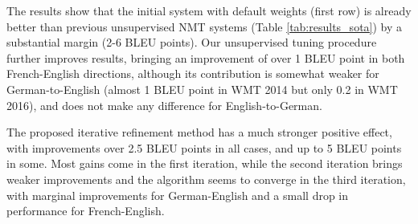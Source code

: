 \documentclass[11pt,a4paper]{article}
\begin{document}
The results show that the initial system with default weights (first row) is already better than previous unsupervised NMT systems (Table \ref{tab:results_sota}) by a substantial margin (2-6 BLEU points). Our unsupervised tuning procedure further improves results, bringing an improvement of over 1 BLEU point in both French-English directions, although its contribution is somewhat weaker for German-to-English (almost 1 BLEU point in WMT 2014 but only 0.2 in WMT 2016), and does not make any difference for English-to-German.

The proposed iterative refinement method has a much stronger positive effect, with improvements over 2.5 BLEU points in all cases, and up to 5 BLEU points in some. Most gains come in the first iteration, while the second iteration brings weaker improvements and the algorithm seems to converge in the third iteration, with marginal improvements for German-English and a small drop in performance for French-English.
\end{document}
